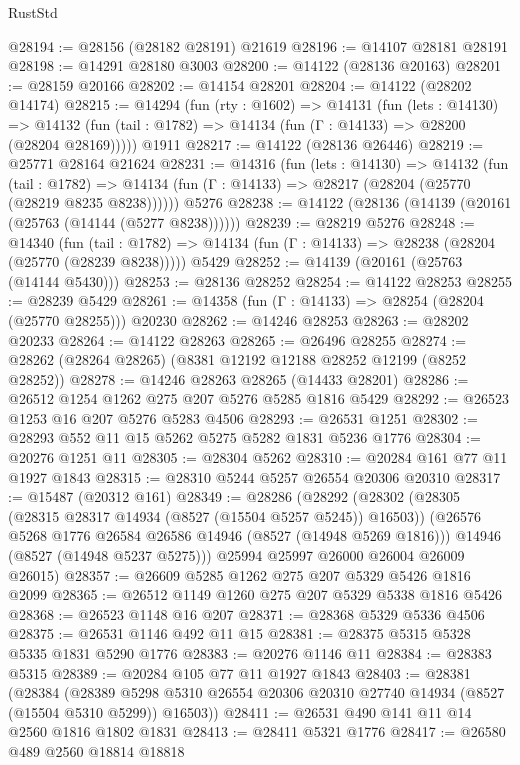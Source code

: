 \begin{lexlean}{RustStd}
\begin{coremodule}
@28194 := @28156 (@28182 @28191) @21619
@28196 := @14107 @28181 @28191
@28198 := @14291 @28180 @3003
@28200 := @14122 (@28136 @20163)
@28201 := @28159 @20166
@28202 := @14154 @28201
@28204 := @14122 (@28202 @14174)
@28215 := @14294
    (fun (rty : @1602) =>
    @14131
      (fun (lets : @14130) =>
      @14132 (fun (tail : @1782) => @14134 (fun (Γ : @14133) => @28200 (@28204 @28169)))))
    @1911
@28217 := @14122 (@28136 @26446)
@28219 := @25771 @28164 @21624
@28231 := @14316
    (fun (lets : @14130) =>
    @14132
      (fun (tail : @1782) =>
      @14134 (fun (Γ : @14133) => @28217 (@28204 (@25770 (@28219 @8235 @8238))))))
    @5276
@28238 := @14122 (@28136 (@14139 (@20161 (@25763 (@14144 (@5277 @8238))))))
@28239 := @28219 @5276
@28248 := @14340
    (fun (tail : @1782) => @14134 (fun (Γ : @14133) => @28238 (@28204 (@25770 (@28239 @8238)))))
    @5429
@28252 := @14139 (@20161 (@25763 (@14144 @5430)))
@28253 := @28136 @28252
@28254 := @14122 @28253
@28255 := @28239 @5429
@28261 := @14358 (fun (Γ : @14133) => @28254 (@28204 (@25770 @28255))) @20230
@28262 := @14246 @28253
@28263 := @28202 @20233
@28264 := @14122 @28263
@28265 := @26496 @28255
@28274 := @28262 (@28264 @28265) (@8381 @12192 @12188 @28252 @12199 (@8252 @28252))
@28278 := @14246 @28263 @28265 (@14433 @28201)
@28286 := @26512 @1254 @1262 @275 @207 @5276 @5285 @1816 @5429
@28292 := @26523 @1253 @16 @207 @5276 @5283 @4506
@28293 := @26531 @1251
@28302 := @28293 @552 @11 @15 @5262 @5275 @5282 @1831 @5236 @1776
@28304 := @20276 @1251 @11
@28305 := @28304 @5262
@28310 := @20284 @161 @77 @11 @1927 @1843
@28315 := @28310 @5244 @5257 @26554 @20306 @20310
@28317 := @15487 (@20312 @161)
@28349 := @28286
    (@28292
      (@28302
        (@28305 (@28315 @28317 @14934 (@8527 (@15504 @5257 @5245)) @16503))
        (@26576 @5268 @1776 @26584 @26586 @14946 (@8527 (@14948 @5269 @1816)))
        @14946
        (@8527 (@14948 @5237 @5275)))
      @25994
      @25997
      @26000
      @26004
      @26009
      @26015)
@28357 := @26609 @5285 @1262 @275 @207 @5329 @5426 @1816 @2099
@28365 := @26512 @1149 @1260 @275 @207 @5329 @5338 @1816 @5426
@28368 := @26523 @1148 @16 @207
@28371 := @28368 @5329 @5336 @4506
@28375 := @26531 @1146 @492 @11 @15
@28381 := @28375 @5315 @5328 @5335 @1831 @5290 @1776
@28383 := @20276 @1146 @11
@28384 := @28383 @5315
@28389 := @20284 @105 @77 @11 @1927 @1843
@28403 := @28381
    (@28384
      (@28389 @5298 @5310 @26554 @20306 @20310 @27740 @14934 (@8527 (@15504 @5310 @5299)) @16503))
@28411 := @26531 @490 @141 @11 @14 @2560 @1816 @1802 @1831
@28413 := @28411 @5321 @1776
@28417 := @26580 @489 @2560 @18814 @18818

\end{coremodule}
\end{lexlean}
